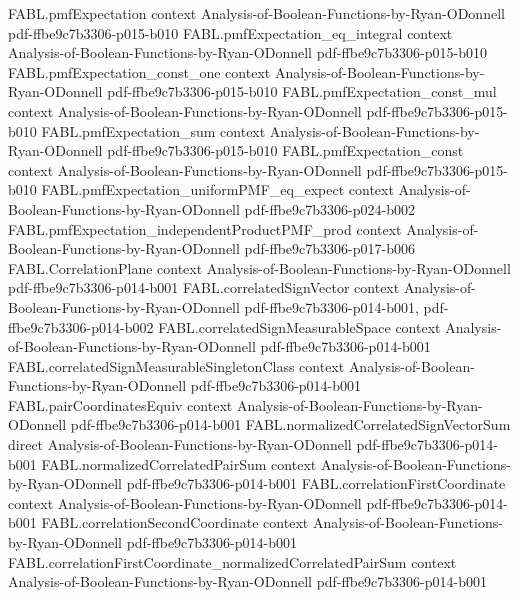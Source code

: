 \begin{theorem}
\proofstep
  {FABL.pmfExpectation}
  {context}
  {Analysis-of-Boolean-Functions-by-Ryan-ODonnell}
  {pdf-ffbe9c7b3306-p015-b010}
\proofstep
  {FABL.pmfExpectation_eq_integral}
  {context}
  {Analysis-of-Boolean-Functions-by-Ryan-ODonnell}
  {pdf-ffbe9c7b3306-p015-b010}
\proofstep
  {FABL.pmfExpectation_const_one}
  {context}
  {Analysis-of-Boolean-Functions-by-Ryan-ODonnell}
  {pdf-ffbe9c7b3306-p015-b010}
\proofstep
  {FABL.pmfExpectation_const_mul}
  {context}
  {Analysis-of-Boolean-Functions-by-Ryan-ODonnell}
  {pdf-ffbe9c7b3306-p015-b010}
\proofstep
  {FABL.pmfExpectation_sum}
  {context}
  {Analysis-of-Boolean-Functions-by-Ryan-ODonnell}
  {pdf-ffbe9c7b3306-p015-b010}
\proofstep
  {FABL.pmfExpectation_const}
  {context}
  {Analysis-of-Boolean-Functions-by-Ryan-ODonnell}
  {pdf-ffbe9c7b3306-p015-b010}
\proofstep
  {FABL.pmfExpectation_uniformPMF_eq_expect}
  {context}
  {Analysis-of-Boolean-Functions-by-Ryan-ODonnell}
  {pdf-ffbe9c7b3306-p024-b002}
\proofstep
  {FABL.pmfExpectation_independentProductPMF_prod}
  {context}
  {Analysis-of-Boolean-Functions-by-Ryan-ODonnell}
  {pdf-ffbe9c7b3306-p017-b006}
\proofstep
  {FABL.CorrelationPlane}
  {context}
  {Analysis-of-Boolean-Functions-by-Ryan-ODonnell}
  {pdf-ffbe9c7b3306-p014-b001}
\proofstep
  {FABL.correlatedSignVector}
  {context}
  {Analysis-of-Boolean-Functions-by-Ryan-ODonnell}
  {pdf-ffbe9c7b3306-p014-b001,
    pdf-ffbe9c7b3306-p014-b002}
\proofstep
  {FABL.correlatedSignMeasurableSpace}
  {context}
  {Analysis-of-Boolean-Functions-by-Ryan-ODonnell}
  {pdf-ffbe9c7b3306-p014-b001}
\proofstep
  {FABL.correlatedSignMeasurableSingletonClass}
  {context}
  {Analysis-of-Boolean-Functions-by-Ryan-ODonnell}
  {pdf-ffbe9c7b3306-p014-b001}
\proofstep
  {FABL.pairCoordinatesEquiv}
  {context}
  {Analysis-of-Boolean-Functions-by-Ryan-ODonnell}
  {pdf-ffbe9c7b3306-p014-b001}
\proofstep
  {FABL.normalizedCorrelatedSignVectorSum}
  {direct}
  {Analysis-of-Boolean-Functions-by-Ryan-ODonnell}
  {pdf-ffbe9c7b3306-p014-b001}
\proofstep
  {FABL.normalizedCorrelatedPairSum}
  {context}
  {Analysis-of-Boolean-Functions-by-Ryan-ODonnell}
  {pdf-ffbe9c7b3306-p014-b001}
\proofstep
  {FABL.correlationFirstCoordinate}
  {context}
  {Analysis-of-Boolean-Functions-by-Ryan-ODonnell}
  {pdf-ffbe9c7b3306-p014-b001}
\proofstep
  {FABL.correlationSecondCoordinate}
  {context}
  {Analysis-of-Boolean-Functions-by-Ryan-ODonnell}
  {pdf-ffbe9c7b3306-p014-b001}
\proofstep
  {FABL.correlationFirstCoordinate_normalizedCorrelatedPairSum}
  {context}
  {Analysis-of-Boolean-Functions-by-Ryan-ODonnell}
  {pdf-ffbe9c7b3306-p014-b001}
\proofstep

\end{theorem}
